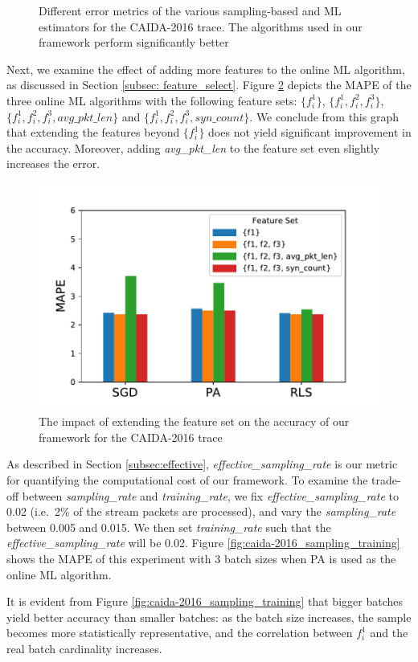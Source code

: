 		\begin{figure}
			\centering
			\small
			
			\caption{Different error metrics of the various sampling-based and ML estimators for the CAIDA-2016 trace. The algorithms used in our framework perform significantly better}
			\label{fig:caida-2016_error}
		\end{figure}
		
		Next, we examine the effect of adding more features to the online ML algorithm, as discussed in Section \ref{subsec: feature_select}. Figure \ref{fig:caida-2016_features} depicts the MAPE of the three online ML algorithms with the following feature sets: $\{f_i^1\}$, $\{f_i^1, f_i^2, f_i^3\}$,  $\{f_i^1, f_i^2, f_i^3, avg\_pkt\_len\}$ and $\{f_i^1, f_i^2, f_i^3, syn\_count\}$. We conclude from this graph that extending the features beyond $\{f_i^1\}$ does not yield significant improvement in the accuracy. Moreover, adding \emph{avg\_pkt\_len} to the feature set even slightly increases the error. 
		
		\begin{figure}[!tb]
			\centering
			\includegraphics[width=.49\textwidth]{img/caida-2016_features.pdf}
			\caption{The impact of extending the feature set on the accuracy of our framework for the CAIDA-2016 trace}
			\label{fig:caida-2016_features}
		\end{figure}
		
		As described in Section \ref{subsec:effective}, \emph{effective\_sampling\_rate} is our metric for quantifying the computational cost of our framework. To examine the trade-off between \emph{sampling\_rate} and \emph{training\_rate}, we fix \emph{effective\_sampling\_rate} to 0.02 (i.e.\, 2\% of the stream packets are processed), and vary the \emph{sampling\_rate} between 0.005 and 0.015. We then set \emph{training\_rate} such that the \emph{effective\_sampling\_rate} will be 0.02. Figure \ref{fig:caida-2016_sampling_training} shows the MAPE of this experiment with 3 batch sizes when PA is used as the online ML algorithm. 
		
		It is evident from Figure \ref{fig:caida-2016_sampling_training} that bigger batches yield better accuracy than smaller batches: as the batch size increases, the sample becomes more statistically representative, and the correlation between $f_i^1$ and the real batch cardinality increases. 
		
